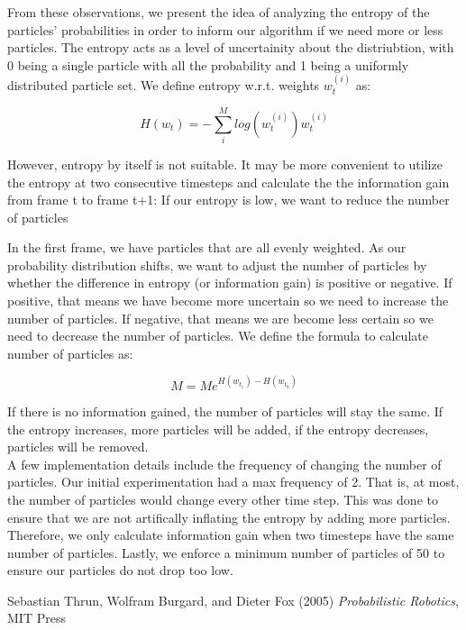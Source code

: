 \documentclass[12pt, a4paper]{article}
\begin{document}
\noindent From these observations, we present the idea of analyzing the entropy of the particles' probabilities in order to inform our algorithm if we need more or less particles. The entropy acts as a level of uncertainity about the distriubtion, with 0 being a single particle with all the probability and 1 being a uniformly distributed particle set. We define entropy w.r.t. weights $w_t^{(i)}$ as:

$$ H(w_t) = - \sum_{i}^{M} log(w_t^{(i)})w_t^{(i)} $$


\noindent However, entropy by itself is not suitable. It may be more convenient to utilize the entropy at two consecutive timesteps and calculate the the information gain from frame t to frame t+1:
If our entropy is low, we want to reduce the number of particles


\noindent In the first frame, we have particles that are all evenly weighted. As our probability distribution shifts, we want to adjust the number of particles by whether the difference in entropy (or information gain) is positive or negative. If positive, that means we have become more uncertain so we need to increase the number of particles. If negative, that means we are become less certain so we need to decrease the number of particles.
We define the formula to calculate number of particles as:

$$M = Me^{H(w_{t_1}) - H(w_{t_0})}$$

\noindent If there is no information gained, the number of particles will stay the same. If the entropy increases, more particles will be added, if the entropy decreases, particles will be removed.\\

\noindent A few implementation details include the frequency of changing the number of particles. Our initial experimentation had a max frequency of 2. That is, at most, the number of particles would change every other time step. This was done to ensure that we are not artifically inflating the entropy by adding more particles. Therefore, we only calculate information gain when two timesteps have the same number of particles. Lastly, we enforce a minimum number of particles of 50 to ensure our particles do not drop too low.
\begin{thebibliography}{9}
  Sebastian Thrun, Wolfram Burgard, and Dieter Fox (2005) \emph{Probabilistic Robotics}, MIT Press
\end{thebibliography}
\end{document}
